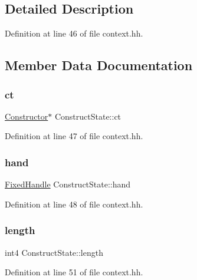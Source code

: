 \subsection{Detailed Description}


Definition at line 46 of file context.\+hh.



\subsection{Member Data Documentation}
\mbox{\label{struct_construct_state_a37dd25a63821e118b18c951a5c0dd5fb}} 
\subsubsection{\texorpdfstring{ct}{ct}}
{\footnotesize\ttfamily \mbox{\hyperlink{class_constructor}{Constructor}}$\ast$ Construct\+State\+::ct}



Definition at line 47 of file context.\+hh.

\mbox{\label{struct_construct_state_a5d6cd28d5b6016a31e09669b9c901143}} 
\subsubsection{\texorpdfstring{hand}{hand}}
{\footnotesize\ttfamily \mbox{\hyperlink{struct_fixed_handle}{Fixed\+Handle}} Construct\+State\+::hand}



Definition at line 48 of file context.\+hh.

\mbox{\label{struct_construct_state_a2b3b540fde4116fd40c1270885234a16}} 
\subsubsection{\texorpdfstring{length}{length}}
{\footnotesize\ttfamily int4 Construct\+State\+::length}



Definition at line 51 of file context.\+hh.

